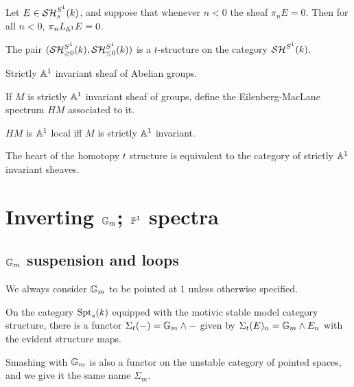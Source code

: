 \documentclass{amsart}%
\begin{document}
\begin{theorem}
  Let $E \in \mathcal{SH}_s^{S^1}(k)$, and suppose that whenever $n < 0$ the
  sheaf $\pi_n E = 0$. Then for all $n<0$, $\pi_n L_{\mathbb{A}^1}E = 0$.
\end{theorem}

\begin{theorem}
  The pair $(\mathcal{SH}_{\geq 0}^{S^1}(k), \mathcal{SH}_{\leq 0}^{S^1}(k))$ is a
  $t$-structure on the category $\mathcal{SH}^{S^1}(k)$. 
\end{theorem}

\begin{definition}
  Strictly $\mathbb{A}^1$ invariant sheaf of Abelian groups.

  If $M$ is strictly $\mathbb{A}^1$ invariant sheaf of groups, define the
  Eilenberg-MacLane spectrum $HM$ associated to it. 
\end{definition}

\begin{proposition}
  $HM$ is $\mathbb{A}^1$ local iff $M$ is strictly $\mathbb{A}^1$ invariant.
\end{proposition}

\begin{proposition}
  The heart of the homotopy $t$ structure is equivalent to the
  category of strictly $\mathbb{A}^1$ invariant sheaves. 
\end{proposition}

\section{Inverting $\mathbb{G}_m$; $\mathbb{P}^1$ spectra}

\subsection{$\mathbb{G}_m$ suspension and loops}

We always consider $\mathbb{G}_m$ to be pointed at $1$ unless otherwise
specified.

\begin{definition}
On the category $\mathrm{Spt}_s(k)$ equipped with the motivic stable model
category structure, there is a functor $\Sigma_t(-) = \mathbb{G}_m \wedge -$
given by $\Sigma_t(E)_n = \mathbb{G}_m \wedge E_n$ with the evident
structure maps.

Smashing with $\mathbb{G}_m$ is also a functor on the unstable category of
pointed spaces, and we give it the same name $\Sigma_m$.
\end{definition}
\end{document}
